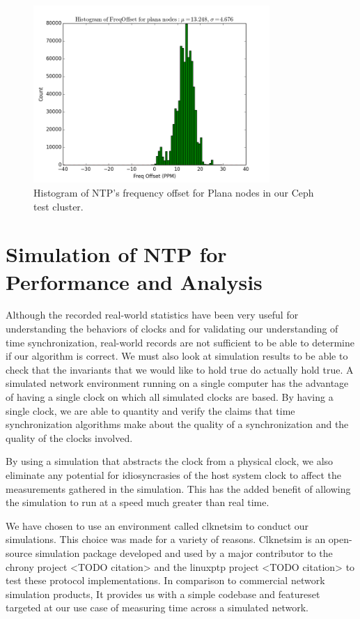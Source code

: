 \begin{figure}[h]
  \label{fig:plana-hist}
  \caption{Histogram of NTP's frequency offset for Plana nodes in our Ceph test cluster.}
  \centering
  \includegraphics[width=0.8\textwidth]{plana-freq-offset.png}
\end{figure}

\section{Simulation of NTP for Performance and Analysis}

Although the recorded real-world statistics have been very useful for
understanding the behaviors of clocks and for validating our
understanding of time synchronization, real-world records are not
sufficient to be able to determine if our algorithm is correct. We
must also look at simulation results to be able to check that the
invariants that we would like to hold true do actually hold true. A
simulated network environment running on a single computer has the
advantage of having a single clock on which all simulated clocks are
based. By having a single clock, we are able to quantity and verify
the claims that time synchronization algorithms make about the quality
of a synchronization and the quality of the clocks involved.

By using a simulation that abstracts the clock from a physical clock,
we also eliminate any potential for idiosyncrasies of the host system
clock to affect the measurements gathered in the simulation. This has
the added benefit of allowing the simulation to run at a speed much
greater than real time.

We have chosen to use an environment called clknetsim %
to conduct our simulations. This choice was made for a variety of
reasons. Clknetsim is an open-source simulation package developed and
used by a major contributor to the chrony project <TODO citation> and the
linuxptp project <TODO citation> to test these protocol implementations. In
comparison to commercial network simulation products, It provides us
with a simple codebase and featureset targeted at our use case of
measuring time across a simulated network.

